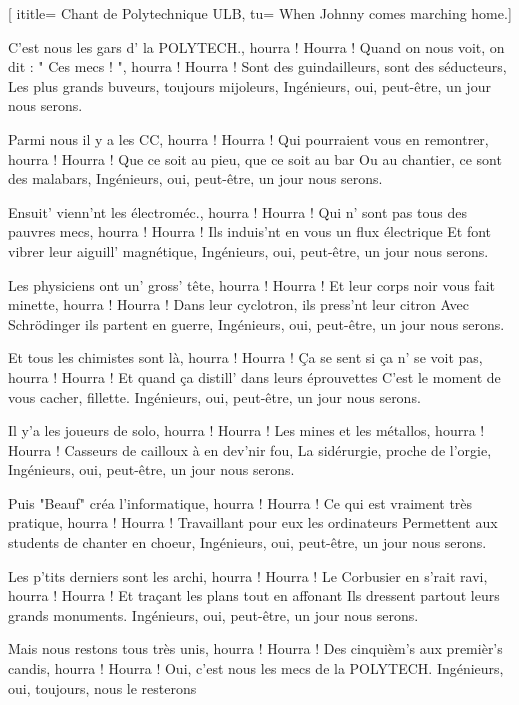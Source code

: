  [
ititle= {Chant de Polytechnique ULB},
tu= {When Johnny comes marching home.}]

\beginverse
C'est nous les gars d' la POLYTECH., hourra ! Hourra !
Quand on nous voit, on dit : " Ces mecs ! ", hourra ! Hourra !
Sont des guindailleurs, sont des séducteurs,
Les plus grands buveurs, toujours mijoleurs,
Ingénieurs, oui, peut-être, un jour nous serons.
\endverse

\beginverse
Parmi nous il y a les CC, hourra ! Hourra !
Qui pourraient vous en remontrer, hourra ! Hourra !
Que ce soit au pieu, que ce soit au bar
Ou au chantier, ce sont des malabars,
Ingénieurs, oui, peut-être, un jour nous serons.
\endverse

\beginverse
Ensuit' vienn'nt les électroméc., hourra ! Hourra !
Qui n' sont pas tous des pauvres mecs, hourra ! Hourra !
Ils induis'nt en vous un flux électrique
Et font vibrer leur aiguill' magnétique,
Ingénieurs, oui, peut-être, un jour nous serons.
\endverse

\beginverse
Les physiciens ont un' gross' tête, hourra ! Hourra !
Et leur corps noir vous fait minette, hourra ! Hourra !
Dans leur cyclotron, ils press'nt leur citron
Avec Schrödinger ils partent en guerre,
Ingénieurs, oui, peut-être, un jour nous serons.
\endverse

\beginverse
Et tous les chimistes sont là, hourra ! Hourra !
Ça se sent si ça n' se voit pas, hourra ! Hourra !
Et quand ça distill' dans leurs éprouvettes
C'est le moment de vous cacher, fillette.
Ingénieurs, oui, peut-être, un jour nous serons.
\endverse

\beginverse
Il y'a les joueurs de solo, hourra ! Hourra !
Les mines et les métallos, hourra ! Hourra !
Casseurs de cailloux à en dev'nir fou,
La sidérurgie, proche de l'orgie,
Ingénieurs, oui, peut-être, un jour nous serons.
\endverse

\beginverse
Puis "Beauf" créa l'informatique, hourra ! Hourra !
Ce qui est vraiment très pratique, hourra ! Hourra !
Travaillant pour eux les ordinateurs
Permettent aux students de chanter en choeur,
Ingénieurs, oui, peut-être, un jour nous serons.
\endverse

\beginverse
Les p'tits derniers sont les archi, hourra ! Hourra !
Le Corbusier en s'rait ravi, hourra ! Hourra !
Et traçant les plans tout en affonant
Ils dressent partout leurs grands monuments.
Ingénieurs, oui, peut-être, un jour nous serons.
\endverse

\beginverse
Mais nous restons tous très unis, hourra ! Hourra !
Des cinquièm's aux premièr's candis, hourra ! Hourra !
Oui, c'est nous les mecs de la POLYTECH.
 {Ingénieurs, oui, toujours, nous le resterons}
\endverse

\endsong
